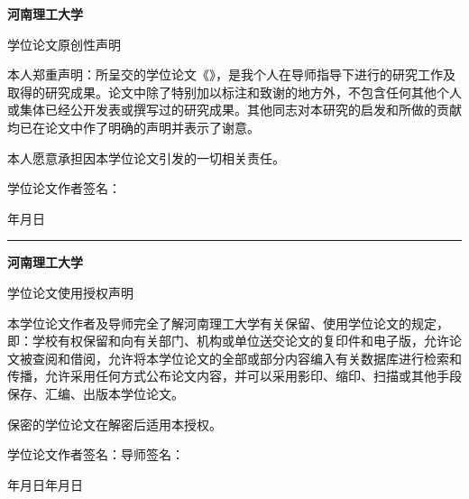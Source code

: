 \thispagestyle{empty}
\begingroup
\hpubodyfont
\fontsize{12bp}{29bp}\selectfont
{}\ccwd
{}\ccwd
{\centering\heiti\bfseries{}
河南理工大学\par
学位论文原创性声明\par}
\vspace{6bp}
本人郑重声明：所呈交的学位论文《》，是我个人在导师指导下进行的研究工作及取得的研究成果。论文中除了特别加以标注和致谢的地方外，不包含任何其他个人或集体已经公开发表或撰写过的研究成果。其他同志对本研究的启发和所做的贡献均已在论文中作了明确的声明并表示了谢意。

本人愿意承担因本学位论文引发的一切相关责任。

\noindent\hfill 学位论文作者签名：\hspace{24mm}\par
\noindent\hfill 年\quad 月\quad 日\hspace{8mm}\par

\vspace{5bp}
\noindent\rule{\dimexpr{}\ccwd\relax}{0.4pt}\par
\vspace{6bp}
{\centering\heiti\bfseries{}
河南理工大学\par
学位论文使用授权声明\par}
\vspace{6bp}
本学位论文作者及导师完全了解河南理工大学有关保留、使用学位论文的规定，即：学校有权保留和向有关部门、机构或单位送交论文的复印件和电子版，允许论文被查阅和借阅，允许将本学位论文的全部或部分内容编入有关数据库进行检索和传播，允许采用任何方式公布论文内容，并可以采用影印、缩印、扫描或其他手段保存、汇编、出版本学位论文。

保密的学位论文在解密后适用本授权。

\noindent 学位论文作者签名：\hspace{20mm}\hfill 导师签名：\hspace{20mm}\par
\noindent\hspace{24mm}年\quad 月\quad 日\hfill 年\quad 月\quad 日\hspace{6mm}\par
\endgroup
\clearpage
